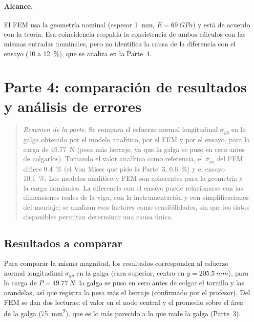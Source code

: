 \documentclass[11pt,a4paper]{article}
\begin{document}
\paragraph{Alcance.} El FEM usa la geometr\'ia nominal (espesor \SI{1}{mm}, $E=\SI{69}{GPa}$) y est\'a de acuerdo con la teor\'ia. Esa coincidencia respalda la consistencia de ambos c\'alculos con las mismas entradas nominales, pero no identifica la causa de la diferencia con el ensayo (\SI{+10}{} a \SI{+12}{\percent}), que se analiza en la Parte~4.

\section{Parte 4: comparaci\'on de resultados y an\'alisis de errores}
\begin{quote}\small\textit{Resumen de la parte.} Se compara el esfuerzo normal longitudinal $\sigma_{yy}$ en la galga obtenido por el modelo anal\'itico, por el FEM y por el ensayo, para la carga de \SI{49,77}{N} (pesa m\'as herraje, ya que la galga se puso en cero antes de colgarlos). Tomando el valor anal\'itico como referencia, el $\sigma_{yy}$ del FEM difiere \SI{+0,4}{\percent} (el Von Mises que pide la Parte~3, \SI{+0,6}{\percent}) y el ensayo \SI{+10,1}{\percent}. Los modelos anal\'itico y FEM son coherentes para la geometr\'ia y la carga nominales. La diferencia con el ensayo puede relacionarse con las dimensiones reales de la viga, con la instrumentaci\'on y con simplificaciones del montaje; se analizan esos factores como sensibilidades, sin que los datos disponibles permitan determinar una causa \'unica.\end{quote}

\subsection{Resultados a comparar}
Para comparar la misma magnitud, los resultados corresponden al esfuerzo normal longitudinal $\sigma_{yy}$ en la galga (cara superior, centro en $y=\SI{205,5}{mm}$), para la carga de $P=\SI{49,77}{N}$: la galga se puso en cero antes de colgar el tornillo y las arandelas, as\'i que registra la pesa m\'as el herraje (confirmado por el profesor). Del FEM se dan dos lecturas: el valor en el nodo central y el promedio sobre el \'area de la galga (\SI{75}{mm^2}), que es lo m\'as parecido a lo que mide la galga (Parte~3).
\end{document}
